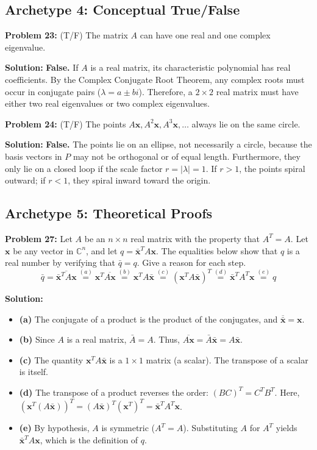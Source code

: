 \documentclass[11pt, letterpaper]{article}
\theoremstyle{definition}
\theoremstyle{remark}
\begin{document}
\subsection{Archetype 4: Conceptual True/False}

\textbf{Problem 23:} (T/F) The matrix $A$ can have one real and one complex eigenvalue.

\textbf{Solution:}
\textbf{False.} If $A$ is a real matrix, its characteristic polynomial has real coefficients. By the Complex Conjugate Root Theorem, any complex roots must occur in conjugate pairs ($\lambda = a \pm bi$). Therefore, a $2 \times 2$ real matrix must have either two real eigenvalues or two complex eigenvalues.

\textbf{Problem 24:} (T/F) The points $A\mathbf{x}, A^2\mathbf{x}, A^3\mathbf{x}, \dots$ always lie on the same circle.

\textbf{Solution:}
\textbf{False.} The points lie on an ellipse, not necessarily a circle, because the basis vectors in $P$ may not be orthogonal or of equal length. Furthermore, they only lie on a closed loop if the scale factor $r = |\lambda| = 1$. If $r > 1$, the points spiral outward; if $r < 1$, they spiral inward toward the origin.

\subsection{Archetype 5: Theoretical Proofs}

\textbf{Problem 27:} Let $A$ be an $n \times n$ real matrix with the property that $A^T = A$. Let $\mathbf{x}$ be any vector in $\mathbb{C}^n$, and let $q = \bar{\mathbf{x}}^T A \mathbf{x}$. The equalities below show that $q$ is a real number by verifying that $\bar{q} = q$. Give a reason for each step.
\[
\bar{q} = \overline{\bar{\mathbf{x}}^T A \mathbf{x}} \overset{(a)}{=} \mathbf{x}^T \overline{A \mathbf{x}} \overset{(b)}{=} \mathbf{x}^T A \bar{\mathbf{x}} \overset{(c)}{=} (\mathbf{x}^T A \bar{\mathbf{x}})^T \overset{(d)}{=} \bar{\mathbf{x}}^T A^T \mathbf{x} \overset{(e)}{=} q
\]

\textbf{Solution:}
\begin{itemize}
    \item \textbf{(a)} The conjugate of a product is the product of the conjugates, and $\overline{\bar{\mathbf{x}}} = \mathbf{x}$.
    \item \textbf{(b)} Since $A$ is a real matrix, $\bar{A} = A$. Thus, $\overline{A\mathbf{x}} = \bar{A}\bar{\mathbf{x}} = A\bar{\mathbf{x}}$.
    \item \textbf{(c)} The quantity $\mathbf{x}^T A \bar{\mathbf{x}}$ is a $1 \times 1$ matrix (a scalar). The transpose of a scalar is itself.
    \item \textbf{(d)} The transpose of a product reverses the order: $(BC)^T = C^T B^T$. Here, $(\mathbf{x}^T (A \bar{\mathbf{x}}))^T = (A \bar{\mathbf{x}})^T (\mathbf{x}^T)^T = \bar{\mathbf{x}}^T A^T \mathbf{x}$.
    \item \textbf{(e)} By hypothesis, $A$ is symmetric ($A^T = A$). Substituting $A$ for $A^T$ yields $\bar{\mathbf{x}}^T A \mathbf{x}$, which is the definition of $q$.
\end{itemize}
\end{document}
